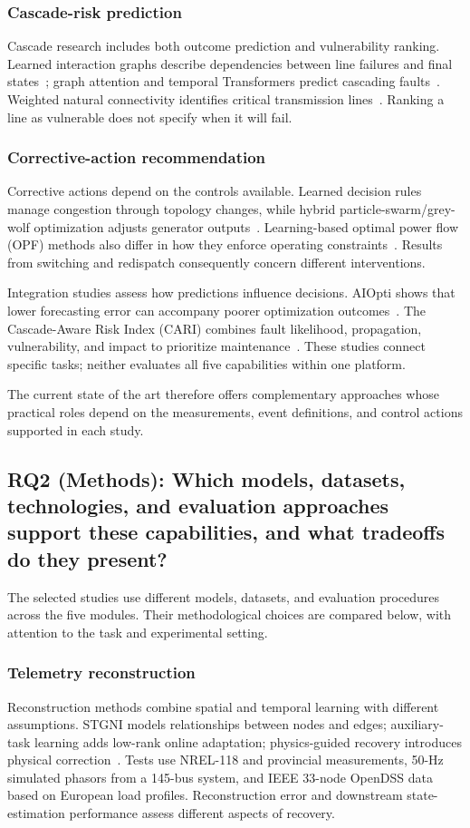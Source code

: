\subsubsection{Cascade-risk prediction}
Cascade research includes both outcome prediction and vulnerability ranking. Learned interaction graphs describe dependencies between line failures and final states~\cite{S02}; graph attention and temporal Transformers predict cascading faults~\cite{N02}. Weighted natural connectivity identifies critical transmission lines~\cite{S03}. Ranking a line as vulnerable does not specify when it will fail.

\subsubsection{Corrective-action recommendation}
Corrective actions depend on the controls available. Learned decision rules manage congestion through topology changes, while hybrid particle-swarm/grey-wolf optimization adjusts generator outputs~\cite{S08,S09}. Learning-based optimal power flow (OPF) methods also differ in how they enforce operating constraints~\cite{S05}. Results from switching and redispatch consequently concern different interventions.

Integration studies assess how predictions influence decisions. AIOpti shows that lower forecasting error can accompany poorer optimization outcomes~\cite{S37}. The Cascade-Aware Risk Index (CARI) combines fault likelihood, propagation, vulnerability, and impact to prioritize maintenance~\cite{S38}. These studies connect specific tasks; neither evaluates all five capabilities within one platform.

The current state of the art therefore offers complementary approaches whose practical roles depend on the measurements, event definitions, and control actions supported in each study.

\subsection{RQ2 (Methods): Which models, datasets, technologies, and evaluation approaches support these capabilities, and what tradeoffs do they present?}
The selected studies use different models, datasets, and evaluation procedures across the five modules. Their methodological choices are compared below, with attention to the task and experimental setting.

\subsubsection{Telemetry reconstruction}
Reconstruction methods combine spatial and temporal learning with different assumptions. STGNI models relationships between nodes and edges; auxiliary-task learning adds low-rank online adaptation; physics-guided recovery introduces physical correction~\cite{S28,N01,S29}. Tests use NREL-118 and provincial measurements, 50-Hz simulated phasors from a 145-bus system, and IEEE 33-node OpenDSS data based on European load profiles. Reconstruction error and downstream state-estimation performance assess different aspects of recovery.


